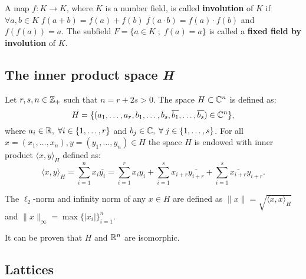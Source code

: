 \documentclass[a4paper,12pt]{article}
\begin{document}
\begin{definition}\label{definition:fixed-field-by-involution}
  A map $f: K \rightarrow K$, where $K$ is a number field, is called \textbf{involution}
  of $K$ if $\forall a,b \in K \; f(a+b) = f(a) + f(b) \; f(a \cdot b) = f(a) \cdot f(b)$ and
  $f(f(a)) = a$. The subfield $F = \{a \in K \;;\; f(a) = a\}$ is called a \textbf{fixed field by
    involution} of $K$.
\end{definition}

\subsection{The inner product space \emph{H}}
\label{sec:org9db062f}
\begin{definition}
  \label{definition:the-h-space}
  Let $r,s,n \in \mathbb{Z}_+$ such that $n = r + 2s > 0$. The space $H \subset \mathbb{C}^n$ is defined
  as:
  \begin{equation*}
    H = \{(a_1,\dots, a_r, b_1,\dots, b_s, \overline{b_1}, \dots, \overline{b_s}) \in \mathbb{C}^n\},
  \end{equation*}
  where $a_i \in \mathbb{R}, \; \forall i \in \{1,\dots,r\}$ and $b_j \in \mathbb{C}, \; \forall \; j \in \{1,\dots,
  s\}$. For all $x = \left(x_1, \dots, x_n\right), y = \left(y_1, \dots, y_n\right) \in H$ the space
  $H$ is endowed with inner product $\langle {x,y} \rangle_H$ defined as:
  \begin{equation*}
    \langle {x,y} \rangle_H = \sum_{i=1}^n{x_i \overline{y_i}} = \sum_{i=1}^r{x_i y_i} + \sum_{i=1}^s{x_{i+r} \overline{y_{i+r}}} + \sum_{i=1}^s{\overline{x_{i+r}} y_{i+r}}.
  \end{equation*}

  The $\ell_2$-norm and infinity norm of any $x \in H$ are defined as $\|x\| =
  \sqrt{\langle{x,x}\rangle_H}$ and $\|x\|_\infty = \max{\{ |x_i| \}}_{i=1}^n $.
\end{definition}

It can be proven that \(H\) and \(\mathbb{R}^n\) are isomorphic.
\subsection{Lattices}
\label{sec:org09a1056}
\end{document}
